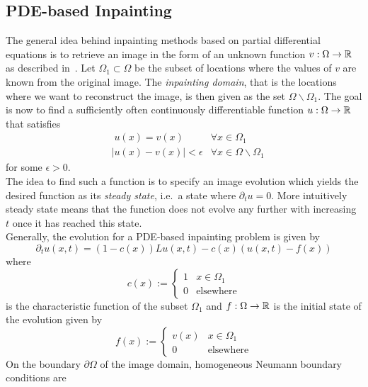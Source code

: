 \subsection{PDE-based Inpainting}
The general idea behind inpainting methods based on partial differential equations  is to
retrieve an image in the form of an unknown function $v: \Omega \rightarrow \mathbb{R}$ as described 
in~\cite{galic05}. Let $\Omega_1\subset\Omega$ be the subset of locations where the values 
of $v$ are known from the original image. The \textit{inpainting domain}, that is the locations 
where we want to reconstruct the image, is then given as the set $\Omega\backslash\Omega_1$. 
The goal is now to find a sufficiently often continuously differentiable function
$u:\Omega\rightarrow\mathbb{R}$ that satisfies
\begin{align}
    &\; u(x) = v(x) &\forall x\in\Omega_1\\
    &\vert u(x) - v(x) \vert < \epsilon &\forall x\in\Omega\backslash\Omega_1
\end{align}
for some $\epsilon>0$.\\
The idea to find such a function is to specify an image evolution which yields the desired
function as its \textit{steady state}, i.e.\ a state where $\partial_{t}u = 0$. More intuitively 
steady state means that the function does not evolve any further with increasing $t$ once it has
reached this state.\\
Generally, the evolution for a PDE-based inpainting problem is given by
\begin{equation}
    \partial_t u(x,t) = (1-c(x))Lu(x,t) - c(x) (u(x, t) - f(x))\label{eq:Evolution}
\end{equation}
where 
\begin{equation} 
    c(x) := \begin{cases}
        1&x\in\Omega_1\\
        0&\text{elsewhere}
    \end{cases} 
\end{equation}
is the characteristic function of the subset $\Omega_1$ and $f:\Omega\rightarrow\mathbb{R}$ is the
initial state of the evolution given by
\begin{equation} 
    f(x) := \begin{cases}
        v(x)&x\in\Omega_1\\
        0&\text{elsewhere}
    \end{cases} 
\end{equation}
\newpage\noindent
On the boundary $\partial\Omega$ of the image domain, homogeneous Neumann boundary conditions are
